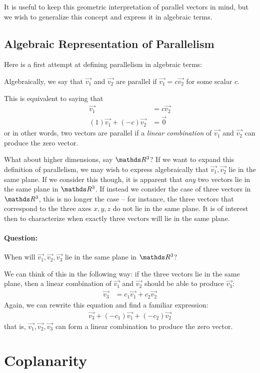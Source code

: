 \documentclass[11pt]{article}
\newcommand{\ques}{\paragraph{Question:}}
\newcommand{\vek}[1]{\vec{#1}}
\begin{document}
It is useful to keep this geometric interpretation of parallel vectors in mind, but we wish to generalize this concept and express it in algebraic terms.

\subsection*{Algebraic Representation of Parallelism}

Here is a first attempt at defining parallelism in algebraic terms:

Algebraically, we say that $\vek{v_1}$ and $\vek{v_2}$ are parallel if $\vek{v_1} = c \vek{v_2}$ for some scalar $c$.

This is equivalent to saying that
\begin{align*}
\vek{v_1} &= c \vek{v_2}
\\
(1) \vek{v_1} + (-c) \vek{v_2} &= \vek{0}
\end{align*}
or in other words, two vectors are parallel if a \emph{linear combination} of $\vek{v_1}$ and $\vek{v_2}$ can produce the zero vector.

What about higher dimensions, say $\bbR^3$? If we want to expand this definition of parallelism, we may wish to express algebraically that $\vek{v_1}, \vek{v_2}$ lie in the same plane. If we consider this though, it is apparent that \emph{any} two vectors lie in the same plane in $\bbR^3$. If instead we consider the case of three vectors in $\bbR^3$, this is no longer the case -- for instance, the three vectors that correspond to the three axes $x,y,z$ do not lie in the same plane. It is of interest then to characterize when exactly three vectors will lie in the same plane.

\ques When will $\vek{v_1}, \vek{v_2}, \vek{v_3}$ lie in the same plane in $\bbR^3$?

We can think of this in the following way: if the three vectors lie in the same plane, then a linear combination of $\vek{v_1}$ and $\vek{v_2}$ should be able to produce $\vek{v_3}$:
\begin{align*}
\vek{v_3} &= c_1 \vek{v_1} + c_2 \vek{v_2}
\end{align*}
Again, we can rewrite this equation and find a familiar expression:
\begin{align*}
\vek{v_3} + (-c_1) \vek{v_1} + (-c_2) \vek{v_2}
\end{align*}
that is, $\vek{v_1}, \vek{v_2}, \vek{v_3}$ can form a linear combination to produce the zero vector.

\section*{Coplanarity}
\end{document}
